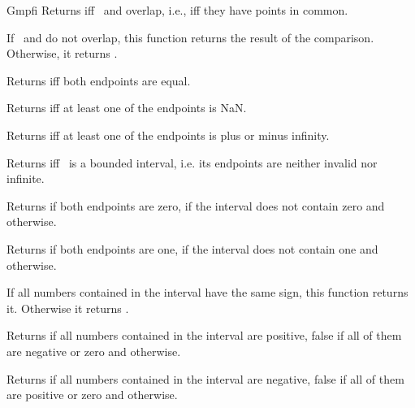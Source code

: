 \begin{ccRefClass} {Gmpfi}
        {Returns  iff \ccVar~and  overlap,
        i.e., iff they have points in common.}

        {If \ccVar~and  do not overlap, this function returns
        the result of the comparison. Otherwise, it returns
        .}


\ccQueryFunctions
{}
        {Returns  iff both endpoints are equal.}

        {Returns  iff at least one of the endpoints is NaN.}

        {Returns  iff at least one of the endpoints is plus or
        minus infinity.}

        {Returns  iff \ccVar~is a bounded interval, i.e. its
        endpoints are neither invalid nor infinite.}

        {Returns  if both endpoints are zero,  if
        the interval does not contain zero and 
        otherwise.}

        {Returns  if both endpoints are one, 
        if the interval does not contain one and 
        otherwise.}

        {If all numbers contained in the interval have the same sign, this
        function returns it. Otherwise it returns .}

        {Returns  if all numbers contained in the interval
        are positive, false if all of them are negative or zero and
         otherwise.}

        {Returns  if all numbers contained in the interval
        are negative, false if all of them are positive or zero and
         otherwise.}



\end{ccRefClass}
